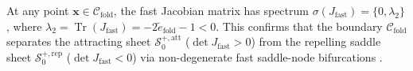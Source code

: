 At any point $\mathbf{x} \in \mathcal{C}_{\mathrm{fold}}$, the fast Jacobian matrix has spectrum $\sigma(J_{\mathrm{fast}}) = \{0, \lambda_2\}$, where $\lambda_2 = \operatorname{Tr}(J_{\mathrm{fast}}) = -2\tilde e_{\mathrm{fold}} - 1 < 0$. This confirms that the boundary $\mathcal{C}_{\mathrm{fold}}$ separates the attracting sheet $\mathcal{S}_0^{+,\mathrm{att}}$ ($\det J_{\mathrm{fast}} > 0$) from the repelling saddle sheet $\mathcal{S}_0^{+,\mathrm{rep}}$ ($\det J_{\mathrm{fast}} < 0$) via non-degenerate fast saddle-node bifurcations \citep{VanDeWiel2002, Kuehn2015}.
